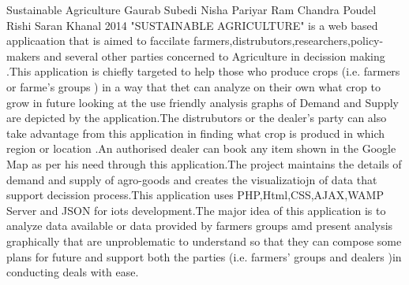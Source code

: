  \begin{conf-abstract}[]
{Sustainable Agriculture}
{ 
Gaurab Subedi 
Nisha Pariyar
Ram Chandra Poudel
Rishi Saran Khanal
}
{2014}
"SUSTAINABLE AGRICULTURE" is a web based applicaation that is aimed to faccilate farmers,distrubutors,researchers,policy-makers and several other parties concerned to Agriculture in decission making .This application is chiefly targeted to help those who produce crops (i.e. farmers or farme's groups ) in a way that thet can analyze on their own what crop to grow in future looking at the use friendly analysis graphs of Demand and Supply are depicted by the application.The distrubutors or the dealer's party can also take advantage from this application in finding what crop is producd in which region or location .An authorised dealer can book any item shown in the Google Map as per his need through this application.The project maintains the details of demand and supply of agro-goods and creates the visualizatiojn of data that support decission process.This application uses PHP,Html,CSS,AJAX,WAMP Server and JSON for iots development.The major idea of this application is to analyze data available or data provided by farmers groups amd present analysis graphically that are unproblematic to understand so that they can compose some plans for future and support both the parties (i.e. farmers' groups and dealers )in conducting deals with ease.
  \end{conf-abstract}